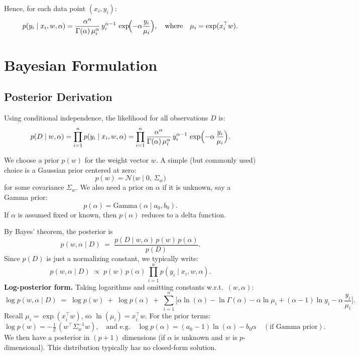 \documentclass{article}
\begin{document}
\noindent
Hence, for each data point $(x_i, y_i)$:
\[
p(y_i \mid x_i, w, \alpha)
= \frac{\alpha^\alpha}{\Gamma(\alpha)\,\mu_i^\alpha} \,
  y_i^{\alpha -1}\,
  \exp\!\Bigl(-\alpha\frac{y_i}{\mu_i}\Bigr),
\quad\text{where}\quad
\mu_i = \exp(x_i^\top w).
\]

\section{Bayesian Formulation}

\subsection{Posterior Derivation}

Using conditional independence, the likelihood for all observations $D$ is:
\[
p(D \mid w, \alpha)
= \prod_{i=1}^n p(y_i \mid x_i, w, \alpha)
= \prod_{i=1}^n
  \frac{\alpha^\alpha}{\Gamma(\alpha)\,\mu_i^\alpha} \,
  y_i^{\alpha -1}\,
  \exp\Bigl(-\alpha\,\frac{y_i}{\mu_i}\Bigr).
\]

We choose a prior $p(w)$ for the weight vector $w$. A simple (but commonly used) choice is a Gaussian prior centered at zero:
\[
  p(w) = \mathcal{N}\bigl(w \mid 0,\, \Sigma_w\bigr)
\]
for some covariance $\Sigma_w$. We also need a prior on $\alpha$ if it is unknown, say a Gamma prior:
\[
  p(\alpha) = \text{Gamma}(\alpha \mid a_0, b_0).
\]
If $\alpha$ is assumed fixed or known, then $p(\alpha)$ reduces to a delta function.

\bigskip

By Bayes' theorem, the posterior is
\[
p(w,\alpha \mid D)
\;=\;
\frac{p(D \mid w,\alpha)\,p(w)\,p(\alpha)}{p(D)}.
\]
Since $p(D)$ is just a normalizing constant, we typically write:
\[
p(w,\alpha \mid D) \;\propto\; 
p(w)\,p(\alpha)\,\prod_{i=1}^n p(y_i \mid x_i, w, \alpha).
\]
\noindent
\textbf{Log-posterior form.}  Taking logarithms and omitting constants w.r.t.\ $(w,\alpha)$:
\[
\log p(w,\alpha \mid D)
\;=\; 
\log p(w) \;+\; \log p(\alpha) 
\;+\; 
\sum_{i=1}^n \biggl[
   \alpha \ln(\alpha) - \ln\Gamma(\alpha) 
   - \alpha\ln\mu_i
   + (\alpha -1)\ln y_i
   - \alpha\,\frac{y_i}{\mu_i}
\biggr].
\]
Recall $\mu_i = \exp(x_i^\top w)$, so $\ln(\mu_i) = x_i^\top w$.  For the prior terms:
\[
\log p(w) = - \tfrac{1}{2}\,(w^\top \Sigma_w^{-1} w),
\quad\text{and e.g.}\quad
\log p(\alpha) = (a_0 -1) \ln(\alpha) - b_0\alpha
\quad (\text{if Gamma prior}).
\]
We then have a posterior in $(p+1)$ dimensions (if $\alpha$ is unknown and $w$ is $p$-dimensional). This distribution typically has no closed-form solution. 
\end{document}
